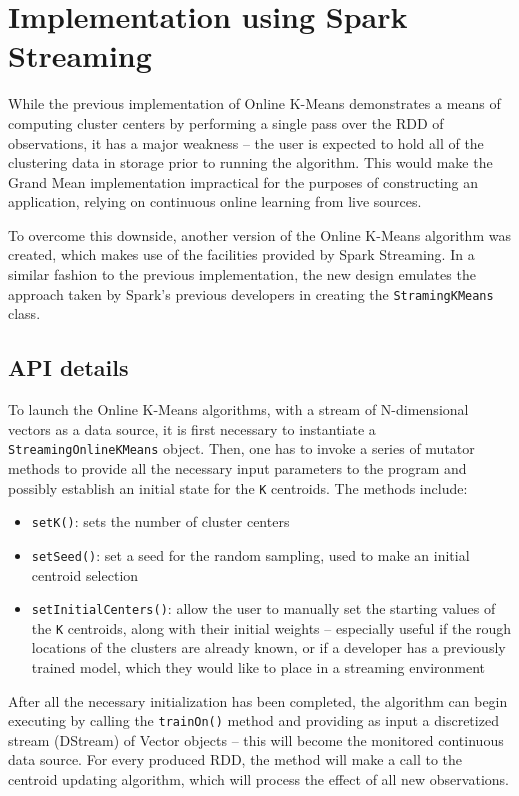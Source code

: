 \documentclass{l4proj}
\begin{document}
\section{Implementation using Spark Streaming}

While the previous implementation of Online K-Means demonstrates a means of computing cluster centers by performing a single pass over the RDD of observations, it has a major weakness -- the user is expected to hold all of the clustering data in storage prior to running the algorithm. This would make the Grand Mean implementation impractical for the purposes of constructing an application, relying on continuous online learning from live sources. 

To overcome this downside, another version of the Online K-Means algorithm was created, which makes use of the facilities provided by Spark Streaming. In a similar fashion to the previous implementation, the new design emulates the approach taken by Spark's previous developers in creating the \texttt{StramingKMeans} class.

\subsection{API details}

To launch the Online K-Means algorithms, with a stream of N-dimensional vectors as a data source, it is first necessary to instantiate a \texttt{StreamingOnlineKMeans} object. Then, one has to invoke a series of mutator methods to provide all the necessary input parameters to the program and possibly establish an initial state for the \texttt{K} centroids. The methods include:

\begin{itemize}
\item \texttt{setK()}: sets the number of cluster centers
\item \texttt{setSeed()}: set a seed for the random sampling, used to make an initial centroid selection
\item \texttt{setInitialCenters()}: allow the user to manually set the starting values of the \texttt{K} centroids, along with their initial weights -- especially useful if the rough locations of the clusters are already known, or if a developer has a previously trained model, which they would like to place in a streaming environment 
\end{itemize}

After all the necessary initialization has been completed, the algorithm can begin executing by calling the \texttt{trainOn()} method and providing as input a discretized stream (DStream) of Vector objects -- this will become the monitored continuous data source. For every produced RDD, the method will make a call to the centroid updating algorithm, which will process the effect of all new observations. 
\end{document}
